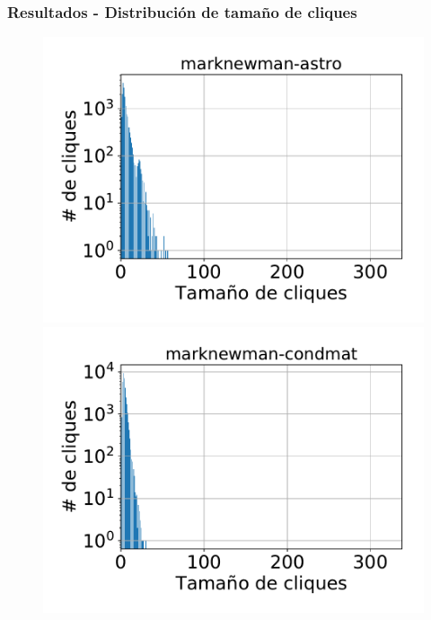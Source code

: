\begin{frame}
\frametitle{Resultados - Distribución de tamaño de cliques}

\begin{figure}
    \centering
    	\begin{minipage}{1\textwidth}
    		\centering
    		\begin{minipage}{0.45\textwidth}
    			\centering
    			\includegraphics[width=1\linewidth]{../img/cliqueDist2/marknewman-astro.pdf}
    		\end{minipage}
    		\begin{minipage}{0.45\textwidth}
    			\centering
    			\includegraphics[width=1\linewidth]{../img/cliqueDist2/marknewman-condmat.pdf}
    		\end{minipage}  		
    	\end{minipage}
    	

\end{figure}
\end{frame}
